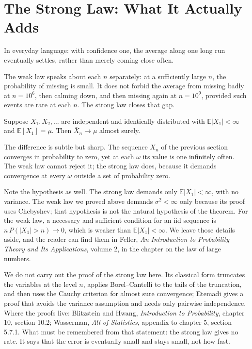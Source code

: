 \section{The Strong Law: What It Actually Adds}

In everyday language: with confidence one, the average along one long run
eventually settles, rather than merely coming close often.

The weak law speaks about each $n$ separately: at a sufficiently large $n$, the
probability of missing is small. It does not forbid the average from missing badly
at $n=10^6$, then calming down, and then missing again at $n=10^9$, provided such
events are rare at each $n$. The strong law closes that gap.

\begin{teorema}
Suppose $X_1,X_2,\dots$ are independent and identically distributed with
$\mathbb{E}|X_1|<\infty$ and $\mathbb{E}[X_1]=\mu$. Then
$\bar X_n\to\mu$ almost surely.
\end{teorema}

The difference is subtle but sharp. The sequence $X_n$ of the previous section
converges in probability to zero, yet at each $\omega$ its value is one infinitely
often. The weak law cannot reject it; the strong law does, because it demands
convergence at every $\omega$ outside a set of probability zero.

Note the hypothesis as well. The strong law demands only $\mathbb{E}|X_1|<\infty$,
with no variance. The weak law we proved above demands $\sigma^2<\infty$ only
because its proof uses Chebyshev; that hypothesis is not the natural hypothesis of
the theorem. For the weak law, a necessary and sufficient condition for an iid
sequence is $n\,P(|X_1|>n)\to0$, which is weaker than $\mathbb{E}|X_1|<\infty$. We
leave those details aside, and the reader can find them in Feller, \emph{An
Introduction to Probability Theory and Its Applications}, volume 2, in the chapter
on the law of large numbers.

We do not carry out the proof of the strong law here. Its classical form truncates
the variables at the level $n$, applies Borel--Cantelli to the tails of the
truncation, and then uses the Cauchy criterion for almost sure convergence; Etemadi
gives a proof that avoids the variance assumption and needs only pairwise
independence. Where the proofs live: Blitzstein and Hwang,
\emph{Introduction to Probability}, chapter 10, section 10.2; Wasserman, \emph{All
of Statistics}, appendix to chapter 5, section 5.7.1. What must be remembered from
that statement: the strong law gives no rate. It says that the error is eventually
small and stays small, not how fast.

